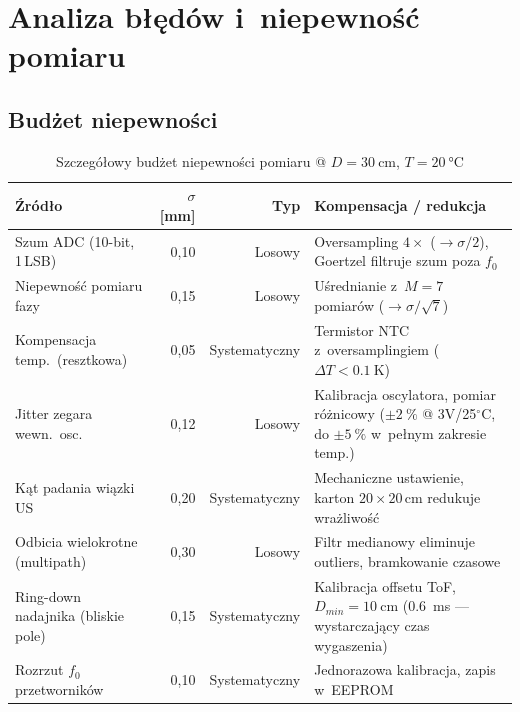\documentclass[a4paper,11pt]{article}
\begin{document}
\section{Analiza błędów i~niepewność pomiaru}
\label{sec:bledy}

\subsection{Budżet niepewności}

\begin{table}[H]
    \centering
    \caption{Szczegółowy budżet niepewności pomiaru @ $D = \SI{30}{\centi\metre}$, $T = \SI{20}{\celsius}$}
    \label{tab:bledy}
    \begin{tabularx}{\textwidth}{>{\raggedright\arraybackslash}p{3.8cm}rrX}
        \toprule
        \textbf{Źródło} & \textbf{$\sigma$ [\si{\milli\metre}]} & \textbf{Typ}
            & \textbf{Kompensacja / redukcja} \\
        \midrule
        Szum ADC (10-bit, 1\,LSB)
            & 0,10
            & Losowy
            & Oversampling $4\times$ ($\to \sigma/2$), Goertzel filtruje szum poza $f_0$ \\
        Niepewność pomiaru fazy
            & 0,15
            & Losowy
            & Uśrednianie z~$M=7$ pomiarów ($\to \sigma/\sqrt{7}$) \\
        Kompensacja temp.\ (resztkowa)
            & 0,05
            & Systematyczny
            & Termistor NTC z~oversamplingiem ($\Delta T < \SI{0,1}{\kelvin}$) \\
        Jitter zegara wewn.\ osc.
            & 0,12
            & Losowy
            & Kalibracja oscylatora, pomiar różnicowy ($\pm\SI{2}{\percent}$ @ 3V/25$^\circ$C, do $\pm\SI{5}{\percent}$ w~pełnym zakresie temp.) \\
        Kąt padania wiązki US
            & 0,20
            & Systematyczny
            & Mechaniczne ustawienie, karton $20\times20$\,cm redukuje wrażliwość \\
        Odbicia wielokrotne (multipath)
            & 0,30
            & Losowy
            & Filtr medianowy eliminuje outliers, bramkowanie czasowe \\
        Ring-down nadajnika (bliskie pole)
            & 0,15
            & Systematyczny
            & Kalibracja offsetu ToF, $D_{min} = \SI{10}{\centi\metre}$ (\SI{0,6}{\milli\second} --- wystarczający czas wygaszenia) \\
        Rozrzut $f_0$ przetworników
            & 0,10
            & Systematyczny
            & Jednorazowa kalibracja, zapis w~EEPROM \\
        \bottomrule
    \end{tabularx}
\end{table}
\end{document}
